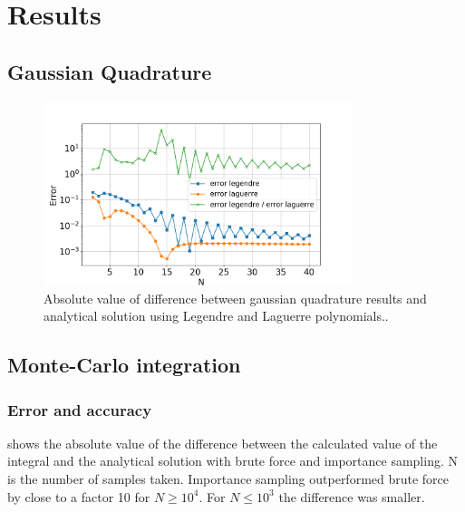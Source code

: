 \section{Results}

\subsection{Gaussian Quadrature}

\begin{figure}[H]
  \centering
  \includegraphics[width=0.8\textwidth]{../figures/gauss_error.png}
  \caption{Absolute value of difference between gaussian quadrature results and analytical
  solution using Legendre and Laguerre polynomials..}

  \label{fig:mc_error}
\end{figure}


\subsection{Monte-Carlo integration}

\subsubsection{Error and accuracy}

 shows the absolute value of the difference between the
calculated value of the integral and the analytical solution with brute force
and importance sampling. N is the number of samples taken.
Importance sampling outperformed brute force by close to a factor 10 for $N \geq 10^4$.
For $N \leq 10^3$ the difference was smaller.

